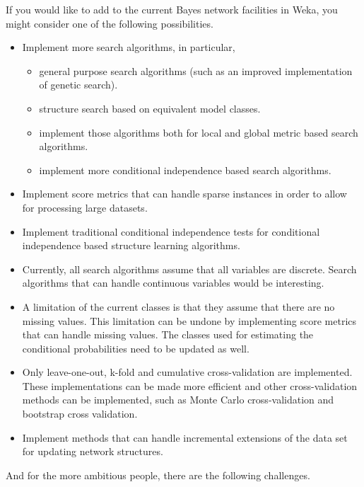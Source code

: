\documentclass[a4paper]{article}
\begin{document}
If you would like to add to the current Bayes network facilities in Weka, you might
consider one of the following possibilities.

\begin{itemize}
\item Implement more search algorithms, in particular, 
\begin{itemize}
\item general purpose search algorithms (such as an improved implementation of 
genetic search).
\item structure search based on equivalent model classes.
\item implement those algorithms both for local and global metric based search algorithms.
\item implement more conditional independence based search algorithms.
\end{itemize}

\item Implement score metrics that can handle sparse instances in order to allow 
for processing large datasets.

\item Implement traditional conditional independence tests for conditional
independence based structure learning algorithms.

\item Currently, all search algorithms assume that all variables are discrete.
Search algorithms that can handle continuous variables would be interesting.

\item A limitation of the current classes is that they assume that there
are no missing values. This limitation can be undone by implementing score metrics 
that can handle missing values.
The classes used for estimating the conditional probabilities need to be updated
as well.

\item Only leave-one-out, k-fold and cumulative cross-validation are implemented.
These implementations can be made more efficient and other cross-validation methods
can be implemented, such as Monte Carlo cross-validation and bootstrap cross
validation.

\item Implement methods that can handle incremental extensions of the data set for
updating network structures.

\end{itemize}

And for the more ambitious people, there are the following challenges.
\end{document}
